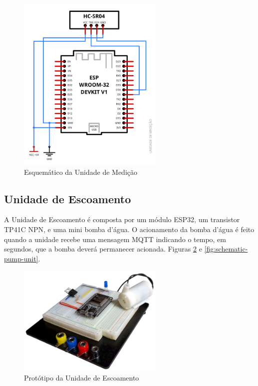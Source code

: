 \begin{figure}[h!]
    \centering
    \includegraphics[width=7cm]{imagem/diagrama-unidade-medicao.png}
    \caption{Esquemático da Unidade de Medição}
    \label{fig:schematic-measure-unit}
\end{figure}

\subsection{Unidade de Escoamento}
A Unidade de Escoamento é composta por um módulo ESP32, um transistor TP41C NPN, e uma mini bomba d'água. O acionamento da bomba d'água é feito quando a unidade recebe uma mensagem MQTT indicando o tempo, em segundos, que a bomba deverá permanecer acionada. Figuras \ref{fig:photo-pump-unit} e \ref{fig:schematic-pump-unit}.

\begin{figure}[h!]
    \centering
    \includegraphics[width=7cm]{imagem/unidade-escoamento.png}
    \caption{Protótipo da Unidade de Escoamento}
    \label{fig:photo-pump-unit}
\end{figure}

